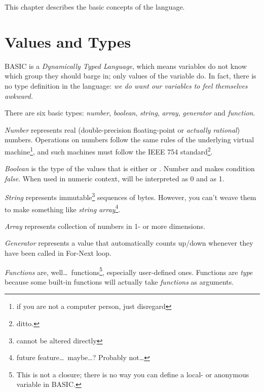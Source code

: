 \quad
{}

This chapter describes the basic concepts of the \tbas{} language.


\section{Values and Types}
\label{valuesandtypes}

BASIC is a \emph{Dynamically Typed Language}, which means variables do not know which group they should barge in; only values of the variable do. In fact, there is no type definition in the language: \emph{we do want our variables to feel themselves awkward.}

There are six basic types: \emph{number}, \emph{boolean}, \emph{string},  \emph{array}, \emph{generator} and \emph{function}.

\emph{Number} represents real (double-precision floating-point or \emph{actually rational}) numbers. Operations on numbers follow the same rules of the underlying virtual machine\footnote{if you are not a computer person, just disregard}, and such machines must follow the IEEE 754 standard\footnote{ditto.}. 

\emph{Boolean} is the type of the values that is either  or . Number  and  makes condition \emph{false}. When used in numeric context,  will be interpreted as 0 and  as 1.

\emph{String} represents immutable\footnote{cannot be altered directly} sequences of bytes. However, you can't weave them to make something like \emph{string array}\footnote{future feature\ldots\ maybe\ldots? Probably not\ldots}.

\emph{Array} represents collection of numbers in 1- or more dimensions.

\emph{Generator} represents a value that automatically counts up/down whenever they have been called in For-Next loop.

\emph{Functions} are, well\ldots\ functions\footnote{This is not a closure; there is no way you can define a local- or anonymous variable in BASIC.}, especially user-defined ones. Functions are \emph{type} because some built-in functions will actually take \emph{functions} as arguments.

